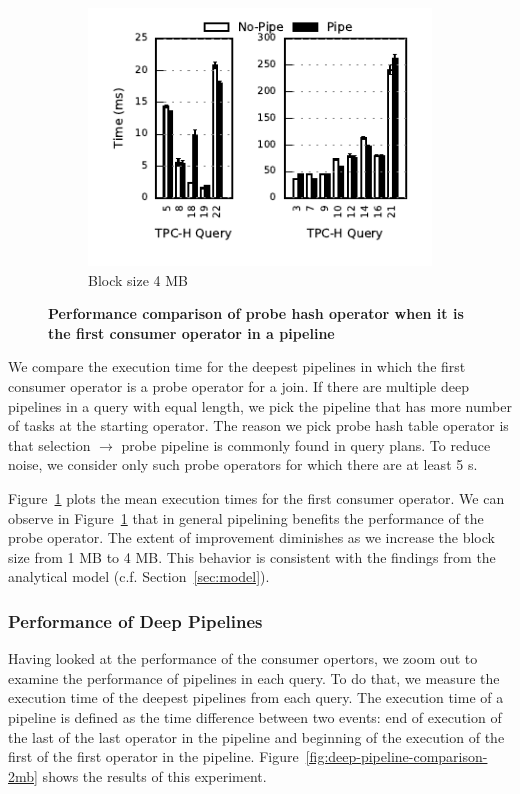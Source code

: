\begin{figure}
\begin{subfigure}[ht]{0.32\textwidth}
		\includegraphics[width=\textwidth]{pipeline/figures/first-consumer-comparison-4mb-withlip}	
		\caption{Block size 4 MB}
	\end{subfigure}
	\caption{\textbf{Performance comparison of probe hash operator when it is the first consumer operator in a pipeline}}
	\label{fig:first-consumer-comparison}
\end{figure}

We compare the \wo{} execution time for the deepest pipelines in which the first consumer operator is a probe operator for a join.
If there are multiple deep pipelines in a query with equal length, we pick the pipeline that has more number of tasks at the starting operator. 
The reason we pick probe hash table operator is that selection $\rightarrow$ probe pipeline is commonly found in query plans.
To reduce noise, we consider only such probe operators for which there are at least 5 \wo{}s.

Figure~\ref{fig:first-consumer-comparison} plots the mean \wo{} execution times for the first consumer operator.
We can observe in Figure~\ref{fig:first-consumer-comparison} that in general pipelining benefits the performance of the probe operator. 
The extent of improvement diminishes as we increase the block size from 1 MB to 4 MB.
This behavior is consistent with the findings from the analytical model (c.f. Section~\ref{sec:model}).

\subsubsection{Performance of Deep Pipelines}
Having looked at the performance of the consumer opertors, we zoom out to examine the performance of pipelines in each query.
To do that, we measure the execution time of the deepest pipelines from each query.
The execution time of a pipeline is defined as the time difference between two events: end of execution of the last \wo{} of the last operator in the pipeline and beginning of the execution of the first \wo{} of the first operator in the pipeline. 
Figure~\ref{fig:deep-pipeline-comparison-2mb} shows the results of this experiment. 

